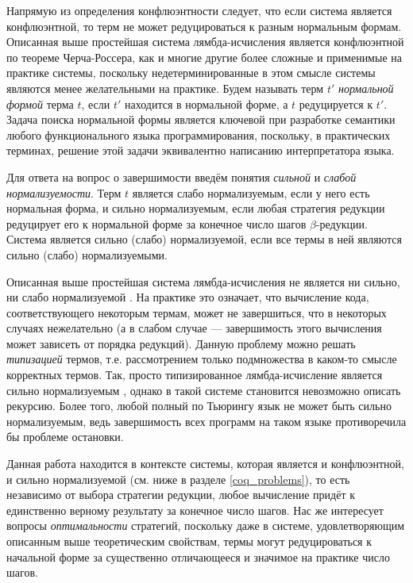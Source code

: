 \documentclass[../thesis.tex]{subfiles}
\begin{document}
Напрямую из определения конфлюэнтности следует, что если система является конфлюэнтной, то терм не может редуцироваться к разным нормальным формам. Описанная выше простейшая система лямбда-исчисления является конфлюэнтной по теореме Черча-Россера, как и многие другие более сложные и применимые на практике системы, поскольку недетерминированные в этом смысле системы являются менее желательными на практике. Будем называть терм $t'$ \textit{нормальной формой} терма $t$, если $t'$ находится в нормальной форме, а $t$ редуцируется к $t'$. Задача поиска нормальной формы является ключевой при разработке семантики любого функционального языка программирования, поскольку, в практических терминах, решение этой задачи эквивалентно написанию интерпретатора языка. 

Для ответа на вопрос о завершимости введём понятия \textit{сильной} и \textit{слабой нормализуемости}. Терм $t$ является слабо нормализуемым, если у него есть нормальная форма, и сильно нормализуемым, если любая стратегия редукции редуцирует его к нормальной форме за конечное число шагов $\beta$-редукции. Система является сильно (слабо) нормализуемой, если все термы в ней являются сильно (слабо) нормализуемыми.

Описанная выше простейшая система лямбда-исчисления не является ни сильно, ни слабо нормализуемой \cite{lambda_calculus}. На практике это означает, что вычисление кода, соответствующего некоторым термам, может не завершиться, что в некоторых случаях нежелательно (а в слабом случае --- завершимость этого вычисления может зависеть от порядка редукций). Данную проблему можно решать \textit{типизацией} термов, т.е. рассмотрением только подмножества в каком-то смысле корректных термов. Так, просто типизированное лямбда-исчисление является сильно нормализуемым \cite{lambda_calculus}, однако в такой системе становится невозможно описать рекурсию. Более того, любой полный по Тьюрингу язык не может быть сильно нормализуемым, ведь завершимость всех программ на таком языке противоречила бы проблеме остановки.

Данная работа находится в контексте системы, которая является и конфлюэнтной, и сильно нормализуемой (см. ниже в разделе \ref{coq_problems}), то есть независимо от выбора стратегии редукции, любое вычисление придёт к единственно верному результату за конечное число шагов. Нас же интересует вопросы \textit{оптимальности} стратегий, поскольку даже в системе, удовлетворяющим описанным выше теоретическим свойствам, термы могут редуцироваться к начальной форме за существенно отличающееся и значимое на практике число шагов.
\end{document}
